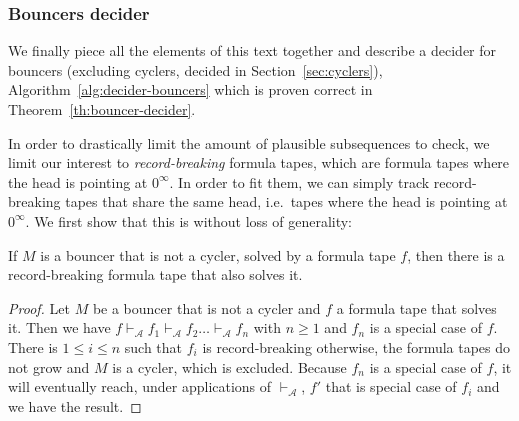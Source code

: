 \subsubsection{Bouncers decider}

We finally piece all the elements of this text together and describe a decider for bouncers (excluding cyclers, decided in Section~\ref{sec:cyclers}), Algorithm~\ref{alg:decider-bouncers} which is proven correct in Theorem~\ref{th:bouncer-decider}.

In order to drastically limit the amount of plausible subsequences to check, we limit our interest to \textit{record-breaking} formula tapes, which are formula tapes where the head is pointing at $0^\infty$. In order to fit them, we can simply track record-breaking tapes that share the same head, i.e.\ tapes where the head is pointing at $0^\infty$. We first show that this is without loss of generality:

\begin{lemma}\label{lem:record-breaking}
    If $M$ is a bouncer that is not a cycler, solved by a formula tape $f$, then there is a record-breaking formula tape that also solves it.
\end{lemma}
\begin{proof}
    Let $M$ be a bouncer that is not a cycler and $f$ a formula tape that solves it. Then we have $f \vdash_\mathcal{A} f_1 \vdash_\mathcal{A} f_2 \dots \vdash_\mathcal{A} f_n$ with $n \geq 1$ and $f_n$ is a special case of $f$. There is $1 \leq i \leq n$ such that $f_{i}$ is record-breaking otherwise, the formula tapes do not grow and $M$ is a cycler, which is excluded. Because $f_n$ is a special case of $f$, it will eventually reach, under applications of $\vdash_\mathcal{A}$,  $f'$ that is special case of $f_i$ and we have the result.
\end{proof}

